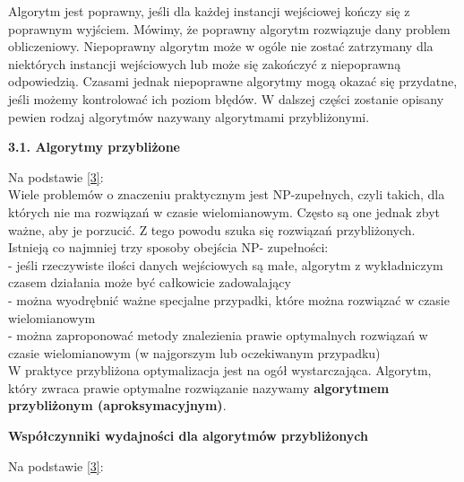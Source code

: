 \documentclass[a4paper, twoside, 12pt, justified]{article}
\begin{document}
	\newpage
	
	Algorytm jest poprawny, jeśli dla każdej instancji wejściowej kończy się z poprawnym wyjściem. Mówimy, że poprawny algorytm rozwiązuje dany problem obliczeniowy. Niepoprawny algorytm może w ogóle nie zostać zatrzymany dla niektórych instancji wejściowych lub	może się zakończyć z niepoprawną odpowiedzią. Czasami jednak niepoprawne algorytmy
	mogą okazać się przydatne, jeśli możemy kontrolować ich poziom błędów. W dalszej części zostanie opisany pewien rodzaj algorytmów nazywany algorytmami przybliżonymi.\\
	
	
	\begin{flushleft}
		\begin{large}
			\textbf{3.1. Algorytmy przybliżone}
		\end{large}
	\end{flushleft}
	\vspace{5mm} %

	Na podstawie \hyperlink{algorithm}{[3]}:\\
	Wiele problemów o znaczeniu praktycznym jest NP-zupełnych, czyli takich, dla których nie ma rozwiązań w czasie wielomianowym. Często są one jednak zbyt ważne, aby je porzucić. Z tego powodu szuka się rozwiązań przybliżonych. Istnieją co najmniej trzy sposoby obejścia NP- zupełności:\\
	- jeśli rzeczywiste ilości danych wejściowych są małe,
	algorytm z wykładniczym czasem działania może być całkowicie zadowalający\\
	- można wyodrębnić ważne specjalne przypadki, które można rozwiązać w czasie wielomianowym\\
	- można zaproponować metody znalezienia prawie optymalnych rozwiązań w czasie wielomianowym (w najgorszym lub oczekiwanym przypadku)\\
	
	W praktyce przybliżona optymalizacja jest na ogół wystarczająca. Algorytm, który zwraca prawie optymalne
	rozwiązanie nazywamy \textbf{algorytmem przybliżonym (aproksymacyjnym)}.\\
	
	\begin{large}
		\begin{center}
			\textbf{Współczynniki wydajności dla algorytmów przybliżonych}
		\end{center}
	\end{large}
	
	Na podstawie \hyperlink{algorithm}{[3]}:\\
	
\end{document}
